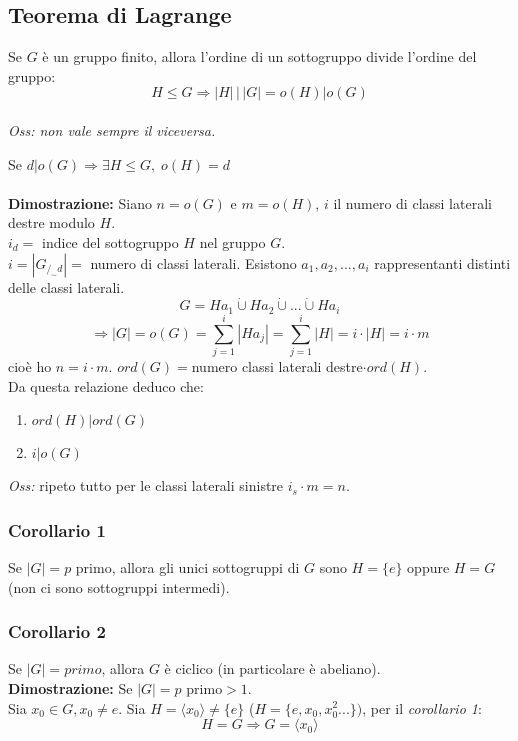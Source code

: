 \subsection{Teorema di Lagrange}
Se \(G\) è un gruppo finito, allora l'ordine di un sottogruppo divide l'ordine del gruppo:
\[H\leq G\Rightarrow |H|\,|\, |G| = o(H)|o(G)\] 
\\\textit{Oss: non vale sempre il viceversa.}

Se \(d|o(G)\Rightarrow\exists H\leq G,\; o(H)=d\)
\\\\\textbf{Dimostrazione:} Siano \(n=o(G)\) e \(m=o(H)\), \(i\) il numero di classi laterali destre modulo \(H\).
\\\(i_d=\) indice del sottogruppo \(H\) nel gruppo \(G\).
\\\(i=|G_{/_\sim d}|=\) numero di classi laterali.
Esistono \(a_1,a_2,...,a_i\) rappresentanti distinti delle classi laterali.
\[G=Ha_1\dot\cup Ha_2\dot\cup...\dot\cup Ha_i\]
\[\Rightarrow |G|=o(G)=\sum ^i_{j=1} |Ha_j|=\sum ^i_{j=1} |H|=i\cdot |H|=i\cdot m\]
cioè ho \(n=i\cdot m\). \(ord(G)=\)numero classi laterali destre\(\cdot ord(H)\).
\\Da questa relazione deduco che:
\begin{enumerate}

	\item \(ord(H)|ord(G)\)

	\item \(i|o(G)\)

\end{enumerate}

\textit{Oss:} ripeto tutto per le classi laterali sinistre \(i_s\cdot m=n\).

\subsubsection{Corollario 1}
Se \(|G|=p\) primo, allora gli unici sottogruppi di \(G\) sono \(H=\{e\}\) oppure \(H=G\) (non ci sono sottogruppi intermedi).

\subsubsection{Corollario 2}
Se \(|G|=primo\), allora \(G\) è ciclico (in particolare è abeliano).
\\
\textbf{Dimostrazione:} Se \(|G|=p\) primo\(>1\).
\\Sia \(x_0\in G, x_0\neq e\). Sia \(H=\langle x_0\rangle\neq \{e\}\) (\(H=\{e,x_0,x_0^2...\})\), per il \textit{corollario 1}: 
\[H=G\Rightarrow G=\langle x_0\rangle\]

